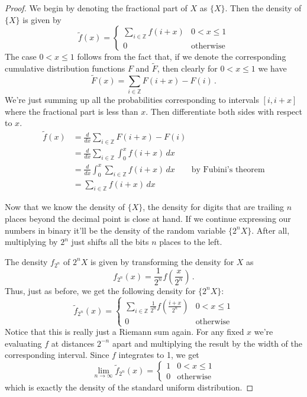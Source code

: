 \begin{proof}
We begin by denoting the fractional part of $X$ as $\{X\}$. Then the density of $\{X\}$ is given by
\[
\tilde{f}(x) =
\begin{cases}
\sum_{i\in\mathbb{Z}}f(i+x) & 0 < x \leq 1\\
0 & \text{otherwise}
\end{cases}
\]
The case $0<x\leq1$ follows from the fact that, if we denote the corresponding cumulative distribution functions $F$ and $\tilde{F}$, then clearly for $0<x\leq1$ we have
\[
\tilde{F}(x) = \sum_{i\in\mathbb{Z}}F(i+x)-F(i)\,.
\]
We're just summing up all the probabilities corresponding to intervals $[i,i+x]$ where the fractional part is less than $x$. Then differentiate both sides with respect to $x$.
\[
\begin{split}
\tilde{f}(x) & =\frac{d}{dx}\sum_{i\in\mathbb{Z}}F(i+x)-F(i)\\
			 & =\frac{d}{dx}\sum_{i\in\mathbb{Z}}\int_0^x f(i+x)\,dx\\
			 & =\frac{d}{dx}\int_0^x\sum_{i\in\mathbb{Z}}f(i+x)\,dx\qquad\text{by Fubini's theorem}\\
			 & =\sum_{i\in\mathbb{Z}}f(i+x)\,dx
\end{split}
\]

Now that we know the density of $\{X\}$, the density for digits that are trailing $n$ places beyond the decimal point is close at hand. If we continue expressing our numbers in binary it'll be the density of the random variable $\{2^nX\}$. After all, multiplying by $2^n$ just shifts all the bits $n$ places to the left.

The density $f_{2^n}$ of $2^nX$ is given by transforming the density for $X$ as
\[
f_{2^n}(x) = \frac{1}{2^n}f\left(\frac{x}{2^n}\right)\,.
\]
Thus, just as before, we get the following density for $\{2^nX\}$:
\[
\tilde{f}_{2^n}(x)=
\begin{cases}
\sum_{i\in\mathbb{Z}}\frac{1}{2^n}f\left(\frac{i+x}{2^n}\right) & 0<x\leq 1\\
0 & \text{otherwise}
\end{cases}
\]
Notice that this is really just a Riemann sum again. For any fixed $x$ we're evaluating $f$ at distances $2^{-n}$ apart and multiplying the result by the width of the corresponding interval. Since $f$ integrates to 1, we get
\[
\lim_{n\rightarrow\infty}\tilde{f}_{2^n}(x) = 
\begin{cases}
1 & 0<x\leq 1\\
0 & \text{otherwise}
\end{cases}
\]
which is exactly the density of the standard uniform distribution.
\end{proof}

